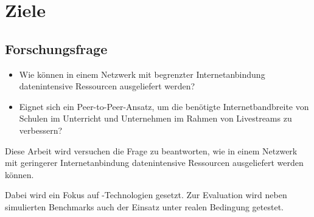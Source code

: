 \section{Ziele}
\subsection{Forschungsfrage}
\begin{itemize}
	\item Wie können in einem Netzwerk mit begrenzter Internetanbindung datenintensive Ressourcen ausgeliefert werden?
	\item Eignet sich ein Peer-to-Peer-Ansatz, um die benötigte Internetbandbreite von Schulen im Unterricht und Unternehmen im Rahmen von Livestreams zu verbessern?
\end{itemize}
Diese Arbeit wird versuchen die Frage zu beantworten, wie in einem Netzwerk mit geringerer Internetanbindung datenintensive Ressourcen ausgeliefert werden können.

Dabei wird ein Fokus auf \pTp-Technologien gesetzt. Zur Evaluation wird neben simulierten Benchmarks auch der Einsatz unter realen Bedingung getestet.  

